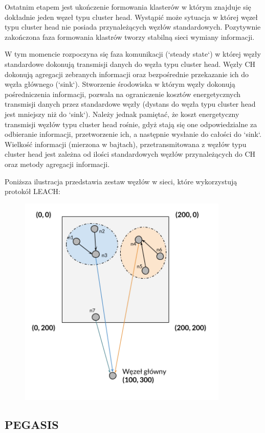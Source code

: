 \documentclass[a4paper,12pt,twoside,openany]{report}
\begin{document}
Ostatnim etapem jest ukończenie formowania klasterów w którym znajduje się dokładnie jeden węzeł typu cluster head.
Wystąpić może sytuacja w której węzeł typu cluster head nie posiada przynależących węzłów standardowych.
Pozytywnie zakończona faza formowania klastrów tworzy stabilną sieci wymiany informacji.

W tym momencie rozpoczyna się faza komunikacji (`steady state`) w której węzły standardowe dokonują transmisji danych do  węzła typu cluster head.
Węzły CH dokonują agregacji zebranych informacji oraz bezpośrednie przekazanie ich do węzła głównego (`sink`).
Stworzenie środowiska w którym węzły dokonują pośredniczenia informacji, pozwala na ograniczenie kosztów energetycznych transmisji danych przez
standardowe węzły (dystans do węzła typu cluster head jest mniejszy niż do `sink`). Należy jednak pamiętać, że koszt energetyczny transmisji węzłów typu cluster head rośnie, gdyż
stają się one odpowiedzialne za odbieranie informacji, przetworzenie ich, a następnie wysłanie do całości do `sink`. Wielkość informacji (mierzona w bajtach), przetransmitowana 
z węzłów typu cluster head jest zależna od ilości standardowych węzłów przynależących do CH oraz metody agregacji informacji.

Poniższa ilustracja przedstawia zestaw węzłów w sieci, które wykorzystują protokół LEACH:

\begin{figure}[H]
 \centering
 \includegraphics[width=10cm]{images/komunikacja_leach.png} 
\end{figure}

\subsection{PEGASIS}
\end{document}
